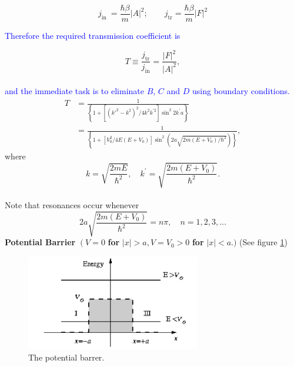 \documentclass{article}
\begin{document}
\begin{equation}
    j_{\text {in }}=\frac{\hbar \beta}{m}|A|^{2}; \qquad j_{\mathrm{tr}}=\frac{\hbar \beta}{m}|F|^{2}
\end{equation}

\textcolor{blue}{Therefore the required transmission coefficient is}

\begin{equation}
    T \equiv \frac{j_{\mathrm{tr}}}{j_{\mathrm{in}}}=\frac{|F|^{2}}{|A|^{2}},
\end{equation}
\\
\textcolor{blue}{and the immediate task is to eliminate $B$, $C$ and $D$ using boundary conditions.}
\begin{equation}
\begin{aligned}
T &=\frac{1}{\left\{1+\left[\left(k'^{2}-k^{2}\right)^{2} / 4 k^{2} k^{\prime 2}\right] \sin ^{2} 2 k^{\prime} a\right\}} \\
&=\frac{1}{\left\{1+\left[V_{0}^{2} / 4 E\left(E+V_{0}\right)\right] \sin ^{2}\left(2 a \sqrt{2 m\left(E+V_{0}\right) / \hbar^{2}}\right)\right\}},
\end{aligned}
\end{equation}
where
\begin{equation}
k=\sqrt{\frac{2 m E}{\hbar^{2}}}, \quad k^{\prime}=\sqrt{\frac{2 m\left(E+V_{0}\right)}{\hbar^{2}}}.
\end{equation}
\\
Note that resonances occur whenever
\begin{equation}
2 a \sqrt{\frac{2 m\left(E+V_{0}\right)}{\hbar^{2}}}=n \pi, \quad n=1,2,3, \ldots
\end{equation}
\textbf{Potential Barrier} $\left(V=0\right.$ \textbf{for} $|x|>a, V=V_{0}>0$ \textbf{for} $|x|<a$.$)$ (See figure \ref{fig4})
\begin{figure}[h]
    \centering
    \includegraphics[width=3.0in]{img4.png}
    \caption{The potential barrer.} \label{fig4}
\end{figure}
\end{document}
